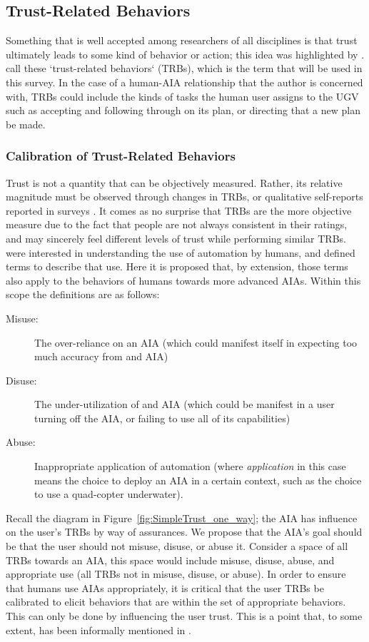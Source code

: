 \subsection{Trust-Related Behaviors} \label{sec:trbs}
Something that is well accepted among researchers of all disciplines is that trust ultimately leads to some kind of behavior or action; this idea was highlighted by \citet{Lewis1985-pr}.  \citet{McKnight2001-fa} call these `trust-related behaviors` (TRBs), which is the term that will be used in this survey. In the case of a human-AIA relationship that the author is concerned with, TRBs could include the kinds of tasks the human user assigns to the UGV such as accepting and following through on its plan, or directing that a new plan be made.

\subsubsection{Calibration of Trust-Related Behaviors}
    Trust is not a quantity that can be objectively measured. Rather, its relative magnitude must be observed through changes in TRBs, or qualitative self-reports reported in surveys \cite{Muir1996-gt}. It comes as no surprise that TRBs are the more objective measure due to the fact that people are not always consistent in their ratings, and may sincerely feel different levels of trust while performing similar TRBs. \citet{Parasuraman1997-co} were interested in understanding the use of automation by humans, and defined terms to describe that use. Here it is proposed that, by extension, those terms also apply to the behaviors of humans towards more advanced AIAs. Within this scope the definitions are as follows:
    
    \begin{description}
        \item [Misuse:] The over-reliance on an AIA (which could manifest itself in expecting too much accuracy from and AIA)
        \item [Disuse:] The under-utilization of and AIA (which could be manifest in a user turning off the AIA, or failing to use all of its capabilities)
        \item [Abuse:] Inappropriate application of automation (where \emph{application} in this case means the choice to deploy an AIA in a certain context, such as the choice to use a quad-copter underwater).
    \end{description}

    Recall the diagram in Figure~\ref{fig:SimpleTrust_one_way}; the AIA has influence on the user's TRBs by way of assurances. We propose that the AIA's goal should be that the user should not misuse, disuse, or abuse it. Consider a space of all TRBs towards an AIA, this space would include misuse, disuse, abuse, and appropriate use (all TRBs not in misuse, disuse, or abuse). In order to ensure that humans use AIAs appropriately, it is critical that the user TRBs be calibrated to elicit behaviors that are within the set of appropriate behaviors. This can only be done by influencing the user trust. This is a point that, to some extent, has been informally mentioned in \citet{Muir1994-ow,Muir1987-mk,Lillard2016-yg,Lee2004-pv,Hutchins2015-if}.

